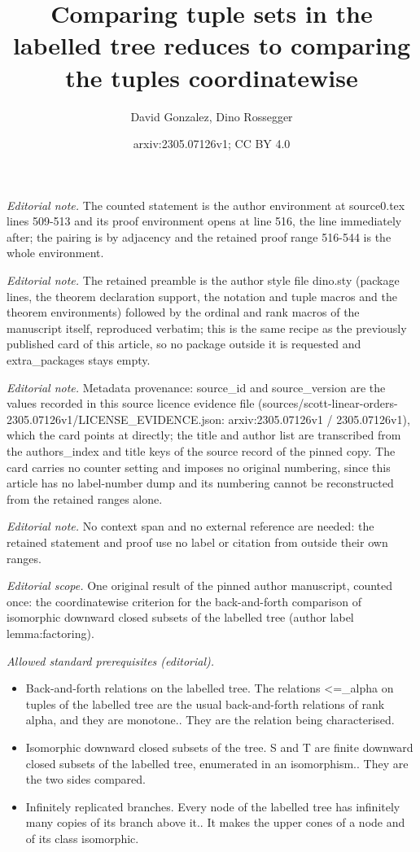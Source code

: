\documentclass[10pt,a4paper]{amsart}
\title{Comparing tuple sets in the labelled tree reduces to comparing the tuples coordinatewise}
\author{David Gonzalez, Dino Rossegger}
\date{arxiv:2305.07126v1; CC BY 4.0}
\begin{document}
\maketitle
\noindent\textit{Editorial note.} The counted statement is the author environment at source0.tex lines 509-513 and its proof environment opens at line 516, the line immediately after; the pairing is by adjacency and the retained proof range 516-544 is the whole environment.\par\medskip
\noindent\textit{Editorial note.} The retained preamble is the author style file dino.sty (package lines, the theorem declaration support, the notation and tuple macros and the theorem environments) followed by the ordinal and rank macros of the manuscript itself, reproduced verbatim; this is the same recipe as the previously published card of this article, so no package outside it is requested and extra\_packages stays empty.\par\medskip
\noindent\textit{Editorial note.} Metadata provenance: source\_id and source\_version are the values recorded in this source licence evidence file (sources/scott-linear-orders-2305.07126v1/LICENSE\_EVIDENCE.json: arxiv:2305.07126v1 / 2305.07126v1), which the card points at directly; the title and author list are transcribed from the authors\_index and title keys of the source record of the pinned copy. The card carries no counter setting and imposes no original numbering, since this article has no label-number dump and its numbering cannot be reconstructed from the retained ranges alone.\par\medskip
\noindent\textit{Editorial note.} No context span and no external reference are needed: the retained statement and proof use no label or citation from outside their own ranges.\par\medskip
\noindent\textit{Editorial scope.} One original result of the pinned author manuscript, counted once: the coordinatewise criterion for the back-and-forth comparison of isomorphic downward closed subsets of the labelled tree (author label lemma:factoring).\par\medskip
\noindent\textit{Allowed standard prerequisites (editorial).}\begin{itemize}
\item Back-and-forth relations on the labelled tree. The relations <=\_alpha on tuples of the labelled tree are the usual back-and-forth relations of rank alpha, and they are monotone.. They are the relation being characterised.
\item Isomorphic downward closed subsets of the tree. S and T are finite downward closed subsets of the labelled tree, enumerated in an isomorphism.. They are the two sides compared.
\item Infinitely replicated branches. Every node of the labelled tree has infinitely many copies of its branch above it.. It makes the upper cones of a node and of its class isomorphic.
\end{itemize}\medskip
\end{document}

